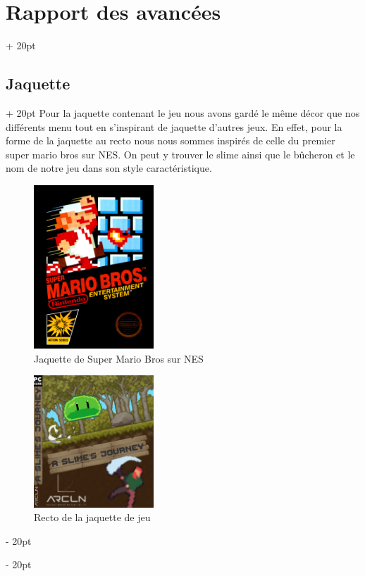 \documentclass[a4paper, 12pt, twoside]{article}
\newcommand{\ind}[1][20pt]{\advance\leftskip + #1}
\newcommand{\deind}[1][20pt]{\advance\leftskip - #1}
\newenvironment{indt}[2][20pt]{#2 \par \ind[#1]}{\par \deind} %
\begin{document}
\begin{indt}{\section{Rapport des avancées}}
        \newpage

        \begin{indt}{\subsection{Jaquette}}
            Pour la jaquette contenant le jeu nous avons gardé le même décor que nos différents menu tout en s’inspirant de jaquette d'autres jeux. En effet, pour la forme de la jaquette au recto nous nous sommes inspirés de celle du premier super mario bros sur NES. On peut y trouver le slime ainsi que le bûcheron et le nom de notre jeu dans son style caractéristique.

            \begin{figure}[h]
                \centering
                \includegraphics[width=0.4\textwidth]{SMB.png}
                \caption{Jaquette de Super Mario Bros sur NES}
                \label{fig:mesh1}
            \end{figure}

            \newpage

            \begin{figure}[h]
                \centering
                \includegraphics[width=0.4\textwidth]{Jaquette0.png}
                \caption{Recto de la jaquette de jeu}
                \label{fig:mesh1}
            \end{figure}


\end{indt}
\end{indt}
\end{document}
